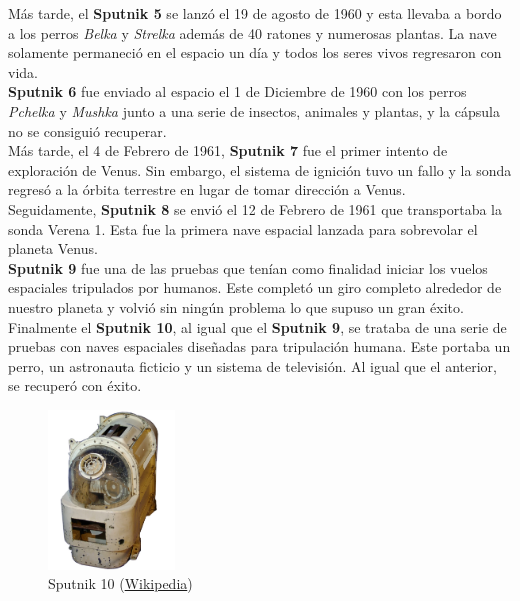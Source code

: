 Más tarde, el \textbf{Sputnik 5} se lanzó el 19 de agosto de 1960 y esta llevaba a bordo a los perros \textit{Belka} y \textit{Strelka} además de 40 ratones y numerosas plantas. La nave solamente permaneció en el espacio un día y todos los seres vivos regresaron con vida.\\

\textbf{Sputnik 6} fue enviado al espacio el 1 de Diciembre de 1960 con los perros \textit{Pchelka} y \textit{Mushka} junto a una serie de insectos, animales y plantas, y la cápsula no se consiguió recuperar. \\

Más tarde, el 4 de Febrero de 1961, \textbf{Sputnik 7} fue el primer intento de exploración de Venus. Sin embargo, el sistema de ignición tuvo un fallo y la sonda regresó a la órbita terrestre en lugar de tomar dirección a Venus.\\

Seguidamente, \textbf{Sputnik 8} se envió el 12 de Febrero de 1961 que transportaba la sonda Verena 1. Esta fue la primera nave espacial lanzada para sobrevolar el planeta Venus.\\

\textbf{Sputnik 9} fue una de las pruebas que tenían como finalidad iniciar los vuelos espaciales tripulados por humanos. Este completó un giro completo alrededor de nuestro planeta y volvió sin ningún problema lo que supuso un gran éxito.\\

Finalmente el \textbf{Sputnik 10}, al igual que el \textbf{Sputnik 9}, se trataba de una serie de pruebas con naves espaciales diseñadas para tripulación humana. Este portaba un perro, un astronauta ficticio y un sistema de televisión. Al igual que el anterior, se recuperó con éxito.

\begin{figure}[H]
\begin{center}
  \includegraphics[width=0.3\textwidth]{./EtapaPrimeriza/imagenes/s10.jpg}
  \caption{Sputnik 10 (\href{https://es.wikipedia.org/wiki/Sputnik\_10\#/media/File:Russian\_space\_dog\_box.jpg} {Wikipedia})}
  \label{s2}
\end{center}
\end{figure}





